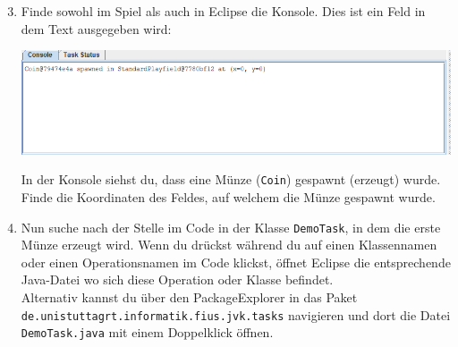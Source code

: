 \begin{enumerate}\setcounter{enumi}{2}

    \item Finde sowohl im Spiel als auch in Eclipse die Konsole. Dies ist ein Feld in dem Text ausgegeben wird:
    \begin{center}
        \includegraphics[width=\linewidth]{./figures/console.PNG}
    \end{center}

    In der Konsole siehst du, dass eine Münze (\texttt{Coin}) gespawnt (erzeugt) wurde.
    Finde die Koordinaten des Feldes, auf welchem die Münze gespawnt wurde.

	\newpage

    \item\label{ex3d} Nun suche nach der Stelle im Code in der Klasse \lstinline{DemoTask}, in dem die erste Münze erzeugt wird.\newline
    \hint
    Wenn du  drückst während du auf einen Klassennamen oder einen Operationsnamen im Code klickst, öffnet Eclipse die entsprechende Java-Datei wo sich diese Operation oder Klasse befindet.\\
    Alternativ kannst du über den PackageExplorer in das Paket\\\texttt{de.unistuttagrt.informatik.fius.jvk.tasks} navigieren und dort die Datei \texttt{DemoTask.java} mit einem Doppelklick öffnen.
\end{enumerate}
